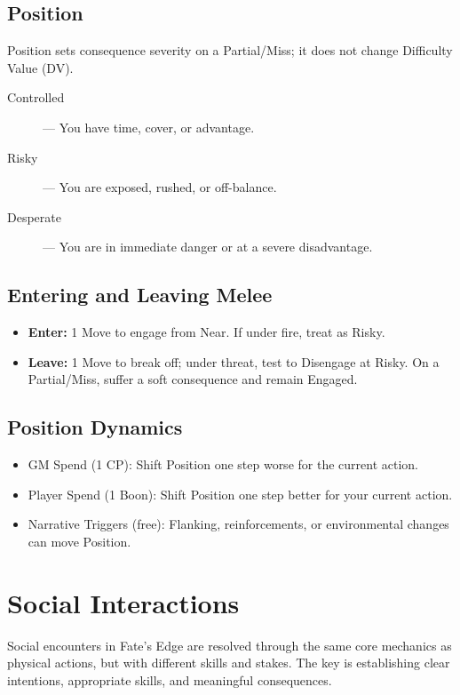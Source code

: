 \subsection*{Position}

Position sets consequence severity on a Partial/Miss; it does not change Difficulty Value (DV).
\begin{description}
  \item[Controlled]  — You have time, cover, or advantage.
  \item[Risky]  — You are exposed, rushed, or off-balance.
  \item[Desperate]  — You are in immediate danger or at a severe disadvantage.
\end{description}

\subsection*{Entering and Leaving Melee}
\begin{itemize}
  \item \textbf{Enter:} 1 Move to engage from Near. If under fire, treat as Risky.
  \item \textbf{Leave:} 1 Move to break off; under threat, test to Disengage at Risky. On a Partial/Miss, suffer a soft consequence and remain Engaged.
\end{itemize}

\subsection*{Position Dynamics}
\begin{itemize}
  \item GM Spend (1 CP): Shift Position one step worse for the current action.
  \item Player Spend (1 Boon): Shift Position one step better for your current action.
  \item Narrative Triggers (free): Flanking, reinforcements, or environmental changes can move Position.
\end{itemize}

\section{Social Interactions}

Social encounters in Fate's Edge are resolved through the same core mechanics as physical actions, but with different skills and stakes. The key is establishing clear intentions, appropriate skills, and meaningful consequences.

